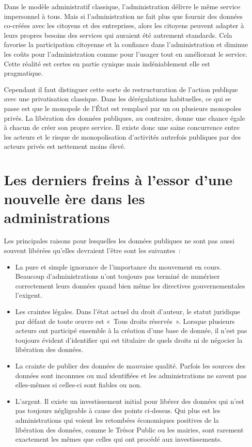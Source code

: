 Dans le modèle administratif classique, l'administration délivre le même service impersonnel à tous. Mais si l'administration ne fait plus que fournir des données co-créées avec les citoyens et des entreprises, alors les citoyens peuvent adapter à leurs propres besoins des services qui auraient été autrement standards. Cela favorise la participation citoyenne et la confiance dans l'administration et diminue les coûts pour l'administration comme pour l'usager tout en améliorant le service. Cette réalité est certes en partie cynique mais indéniablement elle est pragmatique.

Cependant il faut distinguer cette sorte de restructuration de l'action publique avec une privatisation classique. Dans les dérégulations habituelles, ce qui se passe est que le monopole de l'État est remplacé par un ou plusieurs monopoles privés. La libération des données publiques, au contraire, donne une chance égale à chacun de créer son propre service. Il existe donc une saine concurrence entre les acteurs et le risque de monopolisation d'activités autrefois publiques par des acteurs privés est nettement moins élevé.

\section{Les derniers freins à l'essor d'une nouvelle ère dans les administrations}

Les principales raisons pour lesquelles les données publiques ne sont pas aussi souvent libérées qu'elles devraient l'être sont les suivantes~:

\begin{itemize}
\item La pure et simple ignorance de l'importance du mouvement en cours. Beaucoup d'administrations n'ont toujours pas terminé de numériser correctement leurs données quand bien même les directives gouvernementales l'exigent.
\item Les craintes légales. Dans l'état actuel du droit d'auteur, le statut juridique par défaut de toute œuvre est «~Tous droits réservés~». Lorsque plusieurs acteurs ont participé ensemble à la création d'une base de donnée, il n'est pas toujours évident d'identifier qui est titulaire de quels droits ni de négocier la libération des données.
\item La crainte de publier des données de mauvaise qualité. Parfois les sources des données sont inconnues ou mal identifiées et les administrations ne savent pas elles-mêmes si celles-ci sont fiables ou non.
\item L'argent. Il existe un investissement initial pour libérer des données qui n'est pas toujours négligeable à cause des points ci-dessus. Qui plus est les administrations qui voient les retombées économiques positives de la libération des données, comme le Trésor Public ou les mairies, sont rarement exactement les mêmes que celles qui ont procédé aux investissements. 
\end{itemize}

